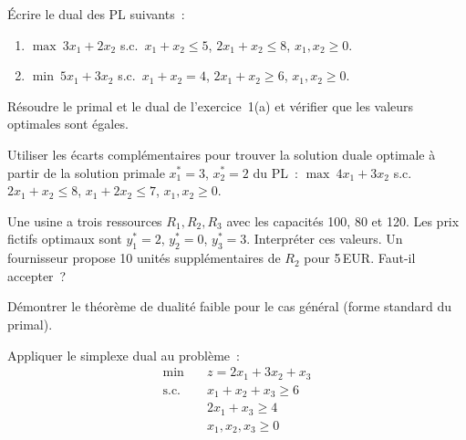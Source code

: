 \begin{exercice}
\'Ecrire le dual des PL suivants~:
\begin{enumerate}
  \item $\max\ 3x_1 + 2x_2$ s.c.\ $x_1 + x_2 \le 5$,
        $2x_1 + x_2 \le 8$, $x_1, x_2 \ge 0$.
  \item $\min\ 5x_1 + 3x_2$ s.c.\ $x_1 + x_2 = 4$,
        $2x_1 + x_2 \ge 6$, $x_1, x_2 \ge 0$.
\end{enumerate}
\end{exercice}

\begin{exercice}
R\'esoudre le primal et le dual de l'exercice~1(a) et v\'erifier que les
valeurs optimales sont \'egales.
\end{exercice}

\begin{exercice}
Utiliser les \'ecarts compl\'ementaires pour trouver la solution duale optimale
\`a partir de la solution primale $x_1^* = 3$, $x_2^* = 2$ du PL~:
$\max\ 4x_1 + 3x_2$ s.c.\ $2x_1 + x_2 \le 8$, $x_1 + 2x_2 \le 7$,
$x_1, x_2 \ge 0$.
\end{exercice}

\begin{exercice}
Une usine a trois ressources $R_1, R_2, R_3$ avec les capacit\'es 100, 80 et
120.  Les prix fictifs optimaux sont $y_1^* = 2$, $y_2^* = 0$, $y_3^* = 3$.
Interpr\'eter ces valeurs.  Un fournisseur propose 10 unit\'es
suppl\'ementaires de $R_2$ pour 5\,EUR.  Faut-il accepter~?
\end{exercice}

\begin{exercice}
D\'emontrer le th\'eor\`eme de dualit\'e faible pour le cas g\'en\'eral
(forme standard du primal).
\end{exercice}

\begin{exercice}
Appliquer le simplexe dual au probl\`eme~:
\[
\begin{aligned}
  \min \quad & z = 2x_1 + 3x_2 + x_3 \\
  \text{s.c.} \quad
    & x_1 + x_2 + x_3 \ge 6 \\
    & 2x_1 + x_3 \ge 4 \\
    & x_1, x_2, x_3 \ge 0
\end{aligned}
\]
\end{exercice}
